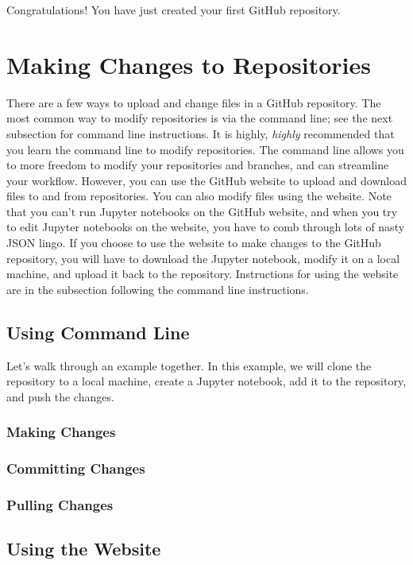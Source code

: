 \documentclass[11pt,a4paper]{article}
\begin{document}
Congratulations!
You have just created your first GitHub repository.

\section*{Making Changes to Repositories}
There are a few ways to upload and change files in a GitHub repository.
The most common way to modify repositories is via the command line; see the next subsection for command line instructions.
It is highly, \textit{highly} recommended that you learn the command line to modify repositories.
The command line allows you to more freedom to modify your repositories and branches, and can streamline your workflow.
However, you can use the GitHub website to upload and download files to and from repositories.
You can also modify files using the website.
Note that you can't run Jupyter notebooks on the GitHub website, and when you try to edit Jupyter notebooks on the website, you have to comb through lots of nasty JSON lingo.
If you choose to use the website to make changes to the GitHub repository, you will have to download the Jupyter notebook, modify it on a local machine, and upload it back to the repository.
Instructions for using the website are in the subsection following the command line instructions.

\subsection*{Using Command Line}
Let's walk through an example together.
In this example, we will clone the repository to a local machine, create a Jupyter notebook, add it to the repository, and push the changes.

\subsubsection*{Making Changes}

\subsubsection*{Committing Changes}

\subsubsection*{Pulling Changes}

\subsection*{Using the Website}
\end{document}
